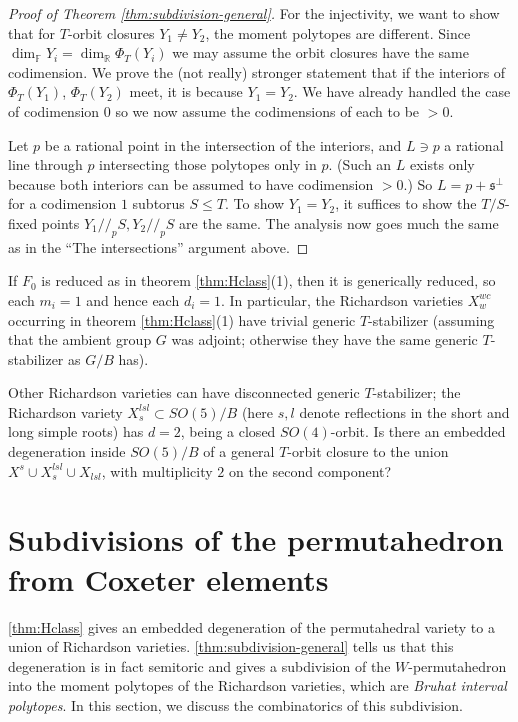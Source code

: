 \documentclass[10pt,a4paper]{amsart}
\newcommand{\RR}{\mathbb{R}}
\newcommand\lie[1]{{\mathfrak #1}}
\newcommand\FF{{\mathbb F}}
\begin{document}
\begin{proof}[Proof of Theorem \ref{thm:subdivision-general}]
  For the injectivity, we want to show that for $T$-orbit closures
  $Y_1 \neq Y_2$, the moment polytopes are different. Since
  $\dim_\FF Y_i = \dim_\RR \Phi_T(Y_i)$ we may assume the orbit
  closures have the same codimension. We prove the (not really) stronger
  statement that if the interiors of $\Phi_T(Y_1)$, $\Phi_T(Y_2)$ meet,
  it is because $Y_1 = Y_2$.
  We have already handled the case of codimension $0$ so we now assume
  the codimensions of each to be $>0$.

  Let $p$ be a rational point in the intersection of the interiors, and
  $L \ni p$ a rational line through $p$ intersecting those polytopes
  only in $p$. (Such an $L$ exists only because both interiors can be
  assumed to have codimension $>0$.) So $L = p + \lie s^\perp$ for a
  codimension $1$ subtorus $S\leq T$. To show $Y_1 = Y_2$, it suffices
  to show the $T/S$-fixed points $Y_1 //_p S, Y_2 //_p S$ are the same.
  The analysis now goes much the same as in the ``The intersections''
  argument above.
\end{proof}


If $F_0$ is reduced as in theorem \ref{thm:Hclass}(1), then it is
generically reduced, so each $m_i=1$ and hence each $d_i=1$.
In particular, the Richardson varieties $X_w^{wc}$ occurring in
theorem \ref{thm:Hclass}(1) have trivial generic $T$-stabilizer
(assuming that the ambient group $G$ was adjoint; otherwise they have
the same generic $T$-stabilizer as $G/B$ has).

Other Richardson varieties can have disconnected generic
$T$-stabilizer; the Richardson variety $X_s^{lsl} \subset SO(5)/B$
(here $s,l$ denote reflections in the short and long simple roots)
has $d=2$, being a closed $SO(4)$-orbit. Is there an embedded degeneration
inside $SO(5)/B$ of a general $T$-orbit closure to the union
$X^s \cup X_s^{lsl} \cup X_{lsl}$, with multiplicity $2$ on the
second component?



\section{Subdivisions of the permutahedron from Coxeter elements}\label{sec:subdiv-permutahedron}



\cref{thm:Hclass} gives an embedded degeneration of the permutahedral variety to a union of Richardson varieties.  \cref{thm:subdivision-general} tells us that this degeneration is in fact semitoric and gives a subdivision of the $W$-permutahedron into the moment polytopes of the Richardson varieties, which are \emph{Bruhat interval polytopes}. In this section, we discuss the combinatorics of this subdivision.
\end{document}
